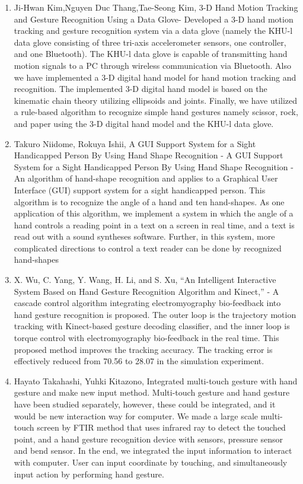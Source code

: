 \documentclass[11pt]{report}
\begin{document}
\begin{enumerate}
    \item Ji-Hwan Kim,Nguyen Duc Thang,Tae-Seong Kim, 3-D Hand Motion Tracking and Gesture Recognition Using a Data Glove- Developed a 3-D hand motion tracking and gesture recognition system via a data glove (namely the KHU-l data glove consisting of three tri-axis accelerometer sensors, one controller, and one Bluetooth). The KHU-l data glove is capable of transmitting hand motion signals to a PC through wireless communication via Bluetooth. Also we have implemented a 3-D digital hand model for hand motion tracking and recognition. The implemented 3-D digital hand model is based on the kinematic chain theory utilizing ellipsoids and joints. Finally, we have utilized a rule-based algorithm to recognize simple hand gestures namely scissor, rock, and paper using the 3-D digital hand model and the KHU-l data glove.\cite{4}
    
    \item Takuro Niidome, Rokuya Ishii, A GUI Support System for a Sight Handicapped Person By Using Hand Shape Recognition - A GUI Support System for a Sight Handicapped Person By Using Hand Shape Recognition - An algorithm of hand-shape recognition and applies to a Graphical User Interface (GUI) support system for a sight handicapped person. This algorithm is to recognize the angle of a hand and ten hand-shapes. As one application of this algorithm, we implement a system in which the angle of a hand controls a reading point in a text on a screen in real time, and a text is read out with a sound syntheses software. Further, in this system, more complicated directions to control a text reader can be done by recognized hand-shapes\cite{5}
    
    \item X. Wu, C. Yang, Y. Wang, H. Li, and S. Xu, “An Intelligent Interactive System Based on Hand Gesture Recognition Algorithm and Kinect,” - A cascade control algorithm integrating electromyography bio-feedback into hand gesture recognition is proposed. The outer loop is the trajectory motion tracking with Kinect-based gesture decoding classifier, and the inner loop is torque control with electromyography bio-feedback in the real time. This proposed method improves the tracking accuracy. The tracking error is effectively reduced from 70.56 to 28.07 in the simulation experiment. \cite{6}
    
    \item Hayato Takahashi, Yuhki Kitazono, Integrated multi-touch gesture with hand gesture and  make new input method. Multi-touch gesture and hand gesture have been studied separately, however, these could be integrated, and it would be new interaction way for computer. We made a large scale multi-touch screen by FTIR method that uses infrared ray to detect the touched point, and a hand gesture recognition device with sensors, pressure  sensor  and  bend  sensor.  In  the  end,  we  integrated  the input  information  to  interact  with  computer. User can input coordinate by touching, and simultaneously input action by performing hand gesture.\cite{7}
    

\end{enumerate}
\end{document}
